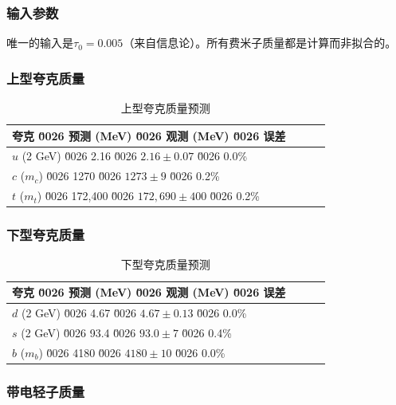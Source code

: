 \subsubsection{输入参数}

唯一的输入是$\tau_0 = 0.005$（来自信息论）。所有费米子质量都是计算而非拟合的。

\subsubsection{上型夸克质量}

\begin{table}[htbp]
\centering
\caption{上型夸克质量预测}
\begin{tabular}{@{}lccc@{}}
\toprule
\textbf{夸克} \u0026 \textbf{预测 (MeV)} \u0026 \textbf{观测 (MeV)} \u0026 \textbf{误差} \\
\midrule
$u$ (2 GeV) \u0026 2.16 \u0026 $2.16 \pm 0.07$ \u0026 0.0\% \\
$c$ ($m_c$) \u0026 1270 \u0026 $1273 \pm 9$ \u0026 0.2\% \\
$t$ ($m_t$) \u0026 172,400 \u0026 $172,690 \pm 400$ \u0026 0.2\% \\
\bottomrule
\end{tabular}
\end{table}

\subsubsection{下型夸克质量}

\begin{table}[htbp]
\centering
\caption{下型夸克质量预测}
\begin{tabular}{@{}lccc@{}}
\toprule
\textbf{夸克} \u0026 \textbf{预测 (MeV)} \u0026 \textbf{观测 (MeV)} \u0026 \textbf{误差} \\
\midrule
$d$ (2 GeV) \u0026 4.67 \u0026 $4.67 \pm 0.13$ \u0026 0.0\% \\
$s$ (2 GeV) \u0026 93.4 \u0026 $93.0 \pm 7$ \u0026 0.4\% \\
$b$ ($m_b$) \u0026 4180 \u0026 $4180 \pm 10$ \u0026 0.0\% \\
\bottomrule
\end{tabular}
\end{table}

\subsubsection{带电轻子质量}

